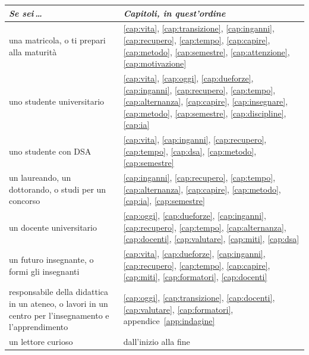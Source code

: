 {\small
\setlength{\tabcolsep}{0.4em}
\setlength{\LTleft}{0pt}\setlength{\LTright}{\fill}
\renewcommand{\arraystretch}{1.15}
\begin{longtable}{@{}>{\raggedright\arraybackslash}p{}>{\raggedright\arraybackslash}p{}@{}}
  \toprule
  \textit{Se sei\,…} & \textit{Capitoli, in quest'ordine} \\
  \midrule
  \endhead
  \bottomrule
  \endlastfoot
  una matricola, o ti prepari alla maturità &
    \ref{cap:vita}, \ref{cap:transizione}, \ref{cap:inganni},
    \ref{cap:recupero}, \ref{cap:tempo}, \ref{cap:capire},
    \ref{cap:metodo}, \ref{cap:semestre}, \ref{cap:attenzione},
    \ref{cap:motivazione} \\ \addlinespace
  uno studente universitario &
    \ref{cap:vita}, \ref{cap:oggi}, \ref{cap:dueforze},
    \ref{cap:inganni}, \ref{cap:recupero}, \ref{cap:tempo},
    \ref{cap:alternanza}, \ref{cap:capire}, \ref{cap:insegnare},
    \ref{cap:metodo}, \ref{cap:semestre}, \ref{cap:discipline},
    \ref{cap:ia} \\ \addlinespace
  uno studente con DSA &
    \ref{cap:vita}, \ref{cap:inganni}, \ref{cap:recupero},
    \ref{cap:tempo}, \ref{cap:dsa}, \ref{cap:metodo},
    \ref{cap:semestre} \\ \addlinespace
  un laureando, un dottorando, o studi per un concorso &
    \ref{cap:inganni}, \ref{cap:recupero}, \ref{cap:tempo},
    \ref{cap:alternanza}, \ref{cap:capire}, \ref{cap:metodo},
    \ref{cap:ia}, \ref{cap:semestre} \\ \addlinespace
  un docente universitario &
    \ref{cap:oggi}, \ref{cap:dueforze}, \ref{cap:inganni},
    \ref{cap:recupero}, \ref{cap:tempo}, \ref{cap:alternanza},
    \ref{cap:docenti}, \ref{cap:valutare}, \ref{cap:miti},
    \ref{cap:dsa} \\ \addlinespace
  un futuro insegnante, o formi gli insegnanti &
    \ref{cap:vita}, \ref{cap:dueforze}, \ref{cap:inganni},
    \ref{cap:recupero}, \ref{cap:tempo}, \ref{cap:capire},
    \ref{cap:miti}, \ref{cap:formatori}, \ref{cap:docenti} \\ \addlinespace
  responsabile della didattica in un ateneo, o lavori in un centro
  per l'insegnamento e l'apprendimento &
    \ref{cap:oggi}, \ref{cap:transizione}, \ref{cap:docenti},
    \ref{cap:valutare}, \ref{cap:formatori},
    appendice~\ref{app:indagine} \\ \addlinespace
  un lettore curioso &
    dall'inizio alla fine \\
\end{longtable}
}

